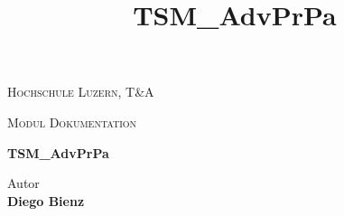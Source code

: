 
\begin{center}
\vspace{1.5cm}
{\scshape\LARGE Hochschule Luzern, T\&A \par}
{\scshape\Large Modul Dokumentation\par}
\vspace{2.0cm}
\title{TSM\_AdvPrPa}
{\huge\bfseries TSM\_AdvPrPa\par}

\vspace{16.0cm}

\end{center}

Autor \\
\textbf{Diego Bienz} \\


